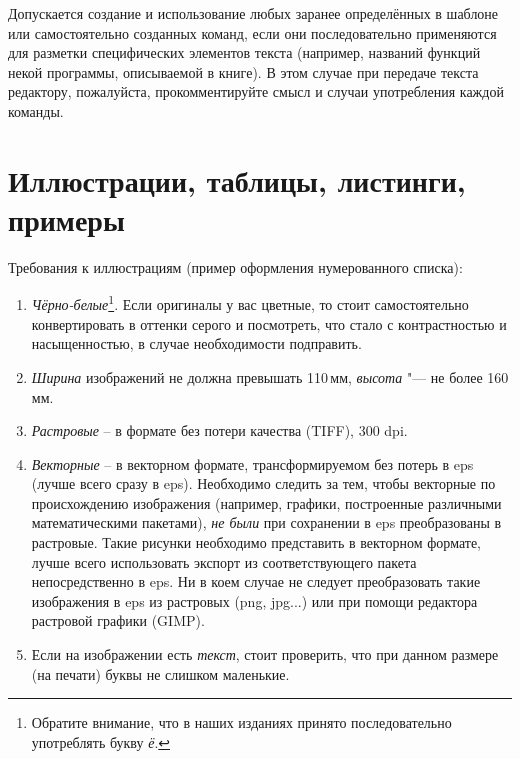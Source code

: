 Допускается создание и использование
любых заранее определённых в шаблоне
или самостоятельно созданных команд,
если они последовательно применяются
для разметки специфических элементов
текста (например, названий функций 
некой программы, описываемой в книге).
В этом случае при передаче текста 
редактору, пожалуйста,
прокомментируйте смысл и случаи 
употребления каждой команды.

\section{Иллюстрации, таблицы, листинги, примеры}
 
Требования к иллюстрациям (пример оформления нумерованного списка):

\begin{enumerate}
\item \emph{Чёрно-белые}\footnote{Обратите внимание, что в наших изданиях принято
  последовательно употреблять букву \emph{ё}.}. Если оригиналы у вас цветные, то стоит
  самостоятельно конвертировать в оттенки серого и посмотреть, что
  стало с контрастностью и насыщенностью, в случае необходимости
  подправить.
\item \emph{Ширина} изображений не должна превышать 110\,мм,
  \emph{высота} "--- не более 160\,мм.
\item \emph{Растровые} -- в формате без потери качества (TIFF), 300 dpi.
\item \emph{Векторные} -- в векторном формате, трансформируемом без потерь в
  eps (лучше всего сразу в eps).
  Необходимо следить за тем, чтобы векторные по происхождению изображения
  (например, графики, построенные различными математическими пакетами), \emph{не 
  были} при сохранении в eps преобразованы в растровые. Такие рисунки необходимо
  представить в векторном формате, лучше всего использовать 
  экспорт из соответствующего пакета непосредственно в eps. Ни в коем случае
  не следует преобразовать такие изображения в eps из растровых (png, jpg...)
  или при помощи редактора растровой графики (GIMP).
\item Если на изображении есть \emph{текст}, стоит проверить, что при
  данном размере (на печати) буквы не слишком маленькие.
\end{enumerate}



